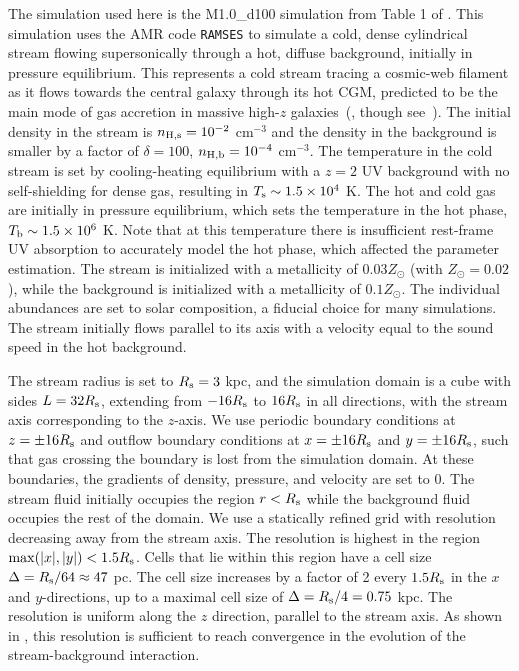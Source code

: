 \documentclass[fleqn,usenatbib]{mnras}
\begin{document}
The simulation used here is the M1.0\_d100 simulation from Table 1 of \cite{mandelker2020Instability}.
This simulation uses the AMR code \texttt{RAMSES} \citep{teyssier2002Cosmological} to simulate a cold, dense cylindrical stream flowing supersonically through a hot, diffuse background, initially in pressure equilibrium.
This represents a cold stream tracing a cosmic-web filament as it flows towards the central galaxy through its hot CGM, predicted to be the main mode of gas accretion in massive high-$z$ galaxies~(\citealt{keres2009Galaxies, dekel2009Cold}, though see~\citealt{nelson2013Moving}).
The initial density in the stream is $n_{\rm H,s}=10^{-2}$ cm$^{-3}$ and the density in the background is smaller by a factor of $\delta=100$, $n_{\rm H,b}=10^{-4}$ cm$^{-3}$.
The temperature in the cold stream is set by cooling-heating equilibrium with a $z=2$ \cite{haardt1996Radiative} UV background with no self-shielding for dense gas, resulting in $T_{\rm s}\sim 1.5 \times 10^4$ K.
The hot and cold gas are initially in pressure equilibrium, which sets the temperature in the hot phase, $T_{\rm b}\sim 1.5 \times 10^6$ K.
Note that at this temperature there is insufficient rest-frame UV absorption to accurately model the hot phase, which affected the parameter estimation.
The stream is initialized with a metallicity of $0.03 Z_\odot$ (with $Z_\odot = 0.02$), while the background is initialized with a metallicity of $0.1 Z_\odot$.
The individual abundances are set to solar composition, a fiducial choice for many simulations.
The stream initially flows parallel to its axis with a velocity equal to the sound speed in the hot background.

The stream radius is set to $R_{\rm s}=3$ kpc, and the simulation domain is a cube with sides $L=32R_{\rm s}$, extending from $-16R_{\rm s}$ to $16R_{\rm s}$ in all directions, with the stream axis corresponding to the $z$-axis.
We use periodic boundary conditions at $z=\pm 16R_{\rm s}$ and outflow boundary conditions at $x=\pm 16R_{\rm s}$ and $y=\pm 16R_{\rm s}$, such that gas crossing the boundary is lost from the simulation domain.
At these boundaries, the gradients of density, pressure, and velocity are set to 0.
The stream fluid initially occupies the region $r<R_{\rm s}$ while the background fluid occupies the rest of the domain.
We use a statically refined grid with resolution decreasing away from the stream axis.
The resolution is highest in the region ${\rm max}(|x|,|y|)<1.5R_{\rm s}$.
Cells that lie within this region have a cell size $\Delta=R_{\rm s}/64\approx 47$ pc.
The cell size increases by a factor of 2 every $1.5R_{\rm s}$ in the $x$ and $y$-directions, up to a maximal cell size of $\Delta=R_{\rm s}/4=0.75$ kpc.
The resolution is uniform along the $z$ direction, parallel to the stream axis.
As shown in \cite{mandelker2020Instability}, this resolution is sufficient to reach convergence in the evolution of the stream-background interaction.
\end{document}
